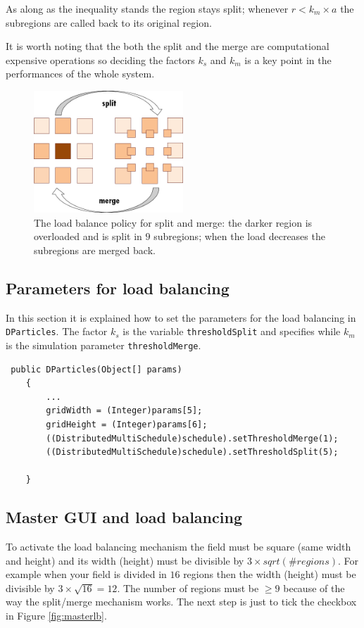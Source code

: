 \documentclass{article}
\begin{document}
As along as the inequality stands the region stays split; whenever $r < k_m \times a$ the subregions are called back to its original region. 

It is worth noting that the both the split and the merge are computational expensive operations so deciding the factors $k_s$ and $k_m$ is a key point in the performances of the whole system.

\begin{figure}[h!]
 \begin{center}
  \includegraphics[width=0.5\textwidth, bb=0 0 512 418]{LoadBalancing.png}
  \caption{The load balance policy for split and merge: the darker region is overloaded and is split in $9$ subregions; when the load decreases the subregions are merged back. \label{fig:lb}}
 \end{center}
\end{figure}

\subsection{Parameters for load balancing}
In this section it is explained how to set the parameters for the load balancing in \texttt{DParticles}. The factor $k_s$ is the variable \texttt{thresholdSplit} and specifies while $k_m$ is the simulation parameter \texttt{thresholdMerge}.

\begin{lstlisting}
 public DParticles(Object[] params)
    {    	
    	...
    	gridWidth = (Integer)params[5];
    	gridHeight = (Integer)params[6];
    	((DistributedMultiSchedule)schedule).setThresholdMerge(1);
        ((DistributedMultiSchedule)schedule).setThresholdSplit(5);

    }    
\end{lstlisting}

\subsection{Master GUI and load balancing}
To activate the load balancing mechanism the field must be square (same width and height) and its width (height) must be divisible by $3 \times sqrt(\#regions)$. For example when your field is divided in $16$ regions then the width (height) must be divisible by $3 \times \sqrt{16} = 12$. The number of regions must be $\geq9$ because of the way the split/merge mechanism works. The next step is just to tick the checkbox in Figure \ref{fig:masterlb}. 
\end{document}
